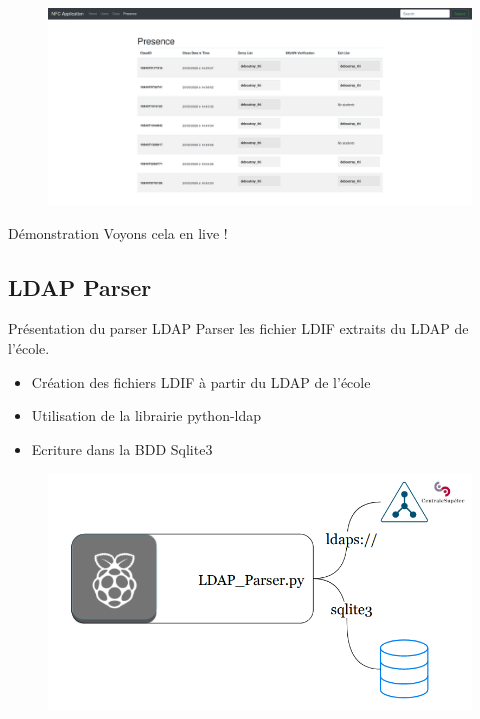 \documentclass[aspectratio=169]{beamer}
\begin{document}
\begin{frame}
  \begin{figure}
    \centering
    \includegraphics[height=.9\textheight]{../assets/capture_page_presence.png}
  \end{figure}
\end{frame}

\begin{frame}{Démonstration}
  Voyons cela en live !
\end{frame}

\subsection{LDAP Parser}

\begin{frame}{Présentation du parser LDAP}
    Parser les fichier LDIF extraits du LDAP de l'école.
    \begin{itemize}
        \item Création des fichiers LDIF à partir du LDAP de l'école
        \item Utilisation de la librairie python-ldap
        \item Ecriture dans la BDD Sqlite3
    \end{itemize}
    \begin{figure}
        \centering
        \includegraphics[width=.45\textwidth]{../assets/ldapparserarchitecture.png}
    \end{figure}
\end{frame}
\end{document}
